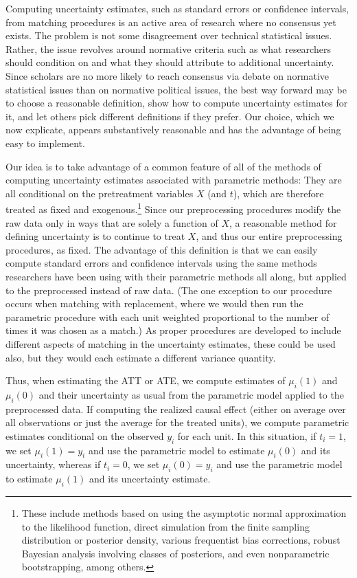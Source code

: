 \documentclass[11pt,titlepage]{article}
\begin{document}
Computing uncertainty estimates, such as standard errors or confidence
intervals, from matching procedures is an active area of research
where no consensus yet exists.  The problem is not some disagreement
over technical statistical issues.  Rather, the issue revolves around
normative criteria such as what researchers should condition on and
what they should attribute to additional uncertainty.  Since scholars
are no more likely to reach consensus via debate on normative
statistical issues than on normative political issues, the best way
forward may be to choose a reasonable definition, show how to
compute uncertainty estimates for it, and let others pick different
definitions if they prefer.  Our choice, which we now explicate,
appears substantively reasonable and has the advantage of being easy
to implement.

Our idea is to take advantage of a common feature of all of the
methods of computing uncertainty estimates associated with parametric
methods: They are all conditional on the pretreatment variables $X$
(and $t$), which are therefore treated as fixed and
exogenous.\footnote{These include methods based on using the
  asymptotic normal approximation to the likelihood function, direct
  simulation from the finite sampling distribution or posterior
  density, various frequentist bias corrections, robust Bayesian
  analysis involving classes of posteriors, and even nonparametric
  bootstrapping, among others.}  Since our preprocessing procedures
modify the raw data only in ways that are solely a function of $X$, a
reasonable method for defining uncertainty is to continue to treat
$X$, and thus our entire preprocessing procedures, as fixed.  The
advantage of this definition is that we can easily compute standard
errors and confidence intervals using the same methods researchers
have been using with their parametric methods all along, but applied
to the preprocessed instead of raw data.  (The one exception to our
procedure occurs when matching with replacement, where we would then
run the parametric procedure with each unit weighted proportional to
the number of times it was chosen as a match.)  As proper procedures
are developed to include different aspects of matching in the
uncertainty estimates, these could be used also, but they would each
estimate a different variance quantity.

Thus, when estimating the ATT or ATE, we compute estimates of
$\mu_i(1)$ and $\mu_i(0)$ and their uncertainty as usual from the
parametric model applied to the preprocessed data.  If computing the
realized causal effect (either on average over all observations or
just the average for the treated units), we compute parametric
estimates conditional on the observed $y_i$ for each unit.  In this
situation, if $t_i=1$, we set $\mu_i(1)=y_i$ and use the parametric
model to estimate $\mu_i(0)$ and its uncertainty, whereas if $t_i=0$,
we set $\mu_i(0)=y_i$ and use the parametric model to estimate
$\mu_i(1)$ and its uncertainty estimate.
\end{document}
